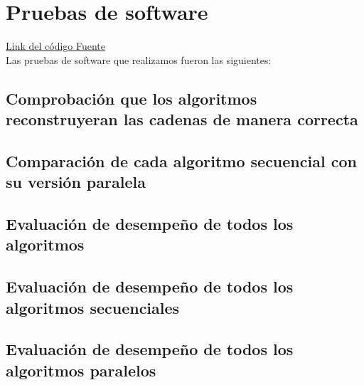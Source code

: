 \documentclass[conference]{IEEEtran}
\begin{document}
\section{\textbf{Pruebas de software}}

\href{https://github.com/vicmaHo/proyecto-PF}
{Link del código Fuente} \\

Las pruebas de software que realizamos fueron las siguientes:

\subsection{Comprobación que los algoritmos reconstruyeran las cadenas de manera correcta}
\subsection{Comparación de cada algoritmo secuencial con su versión paralela}
\subsection{Evaluación de desempeño de todos los algoritmos}
\subsection{Evaluación de desempeño de todos los algoritmos secuenciales}
\subsection{Evaluación de desempeño de todos los algoritmos paralelos}

 
\end{document}
